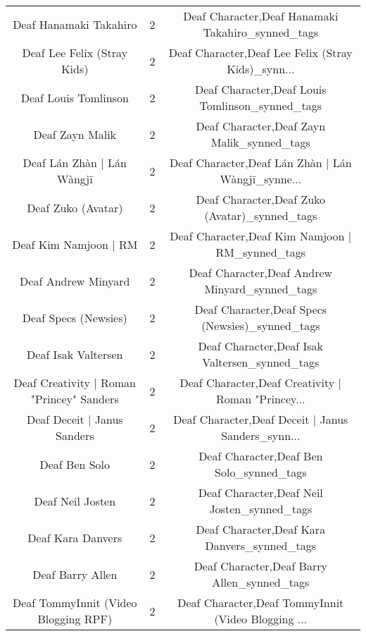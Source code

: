\begin{table}[h!]
{\begin{tabular}{|c|c|c|}
                            Deaf Hanamaki Takahiro &          2 &  Deaf Character,Deaf Hanamaki Takahiro\_synned\_tags \\
                       Deaf Lee Felix (Stray Kids) &          2 & Deaf Character,Deaf Lee Felix (Stray Kids)\_synn... \\
                              Deaf Louis Tomlinson &          2 &    Deaf Character,Deaf Louis Tomlinson\_synned\_tags \\
                                   Deaf Zayn Malik &          2 &         Deaf Character,Deaf Zayn Malik\_synned\_tags \\
                        Deaf Lán Zhàn | Lán Wàngjī &          2 & Deaf Character,Deaf Lán Zhàn | Lán Wàngjī\_synne... \\
                                Deaf Zuko (Avatar) &          2 &      Deaf Character,Deaf Zuko (Avatar)\_synned\_tags \\
                             Deaf Kim Namjoon | RM &          2 &   Deaf Character,Deaf Kim Namjoon | RM\_synned\_tags \\
                               Deaf Andrew Minyard &          2 &     Deaf Character,Deaf Andrew Minyard\_synned\_tags \\
                              Deaf Specs (Newsies) &          2 &    Deaf Character,Deaf Specs (Newsies)\_synned\_tags \\
                               Deaf Isak Valtersen &          2 &     Deaf Character,Deaf Isak Valtersen\_synned\_tags \\
         Deaf Creativity | Roman "Princey" Sanders &          2 & Deaf Character,Deaf Creativity | Roman "Princey... \\
                       Deaf Deceit | Janus Sanders &          2 & Deaf Character,Deaf Deceit | Janus Sanders\_synn... \\
                                     Deaf Ben Solo &          2 &           Deaf Character,Deaf Ben Solo\_synned\_tags \\
                                  Deaf Neil Josten &          2 &        Deaf Character,Deaf Neil Josten\_synned\_tags \\
                                 Deaf Kara Danvers &          2 &       Deaf Character,Deaf Kara Danvers\_synned\_tags \\
                                  Deaf Barry Allen &          2 &        Deaf Character,Deaf Barry Allen\_synned\_tags \\
              Deaf TommyInnit (Video Blogging RPF) &          2 & Deaf Character,Deaf TommyInnit (Video Blogging ... \\

\end{tabular}}
\end{table}

